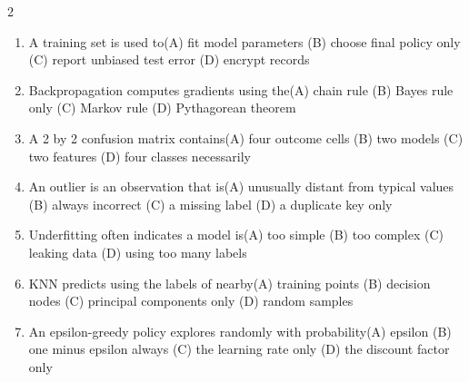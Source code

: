 \documentclass[a4paper]{article}
\begin{document}
\begin{multicols*}{2}
\fontsize{8.5}{10}\selectfont
\begin{enumerate}[resume]
\item A training set is used to\newline\hspace*{0.6em}(A) fit model parameters \quad (B) choose final policy only \newline\hspace*{0.6em}(C) report unbiased test error \quad (D) encrypt records
\item Backpropagation computes gradients using the\newline\hspace*{0.6em}(A) chain rule \quad (B) Bayes rule only \newline\hspace*{0.6em}(C) Markov rule \quad (D) Pythagorean theorem
\item A 2 by 2 confusion matrix contains\newline\hspace*{0.6em}(A) four outcome cells \quad (B) two models \newline\hspace*{0.6em}(C) two features \quad (D) four classes necessarily
\item An outlier is an observation that is\newline\hspace*{0.6em}(A) unusually distant from typical values \quad (B) always incorrect \newline\hspace*{0.6em}(C) a missing label \quad (D) a duplicate key only
\item Underfitting often indicates a model is\newline\hspace*{0.6em}(A) too simple \quad (B) too complex \newline\hspace*{0.6em}(C) leaking data \quad (D) using too many labels
\item KNN predicts using the labels of nearby\newline\hspace*{0.6em}(A) training points \quad (B) decision nodes \newline\hspace*{0.6em}(C) principal components only \quad (D) random samples
\item An epsilon-greedy policy explores randomly with probability\newline\hspace*{0.6em}(A) epsilon \quad (B) one minus epsilon always \newline\hspace*{0.6em}(C) the learning rate only \quad (D) the discount factor only

\end{enumerate}
\end{multicols*}
\end{document}
